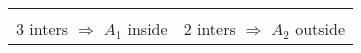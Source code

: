 
\begin{tabu}{cc}
 & 
 \\
3 inters $\Rightarrow$ $A_1$ inside &
2 inters $\Rightarrow$ $A_2$ outside \\
\end{tabu}
